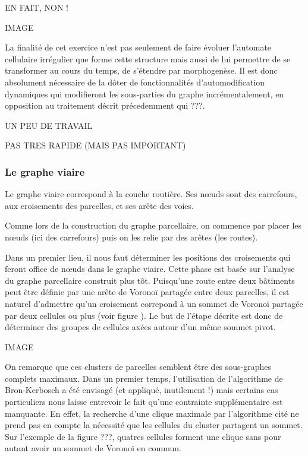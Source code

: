 \documentclass[10pt]{article}
\begin{document}
EN FAIT, NON !

IMAGE

La finalité de cet exercice n'est pas seulement de faire évoluer
l'automate cellulaire irrégulier que forme cette structure mais aussi
de lui permettre de se transformer au cours du temps, de s'étendre par
morphogenèse. Il est donc absolument nécessaire de la dôter de
fonctionnalités d'automodification dynamiques qui modifieront les
sous-parties du graphe incrémentalement, en opposition au traitement
décrit précedemment qui ???.

UN PEU DE TRAVAIL

PAS TRES RAPIDE (MAIS PAS IMPORTANT)

\subsubsection{Le graphe viaire}

Le graphe viaire correspond à la couche routière. Ses n\oe uds sont
des carrefours, aux croisements des parcelles, et ses arête des voies.

Comme lors de la construction du graphe parcellaire, on commence par
placer les n\oe uds (ici des carrefours) puis on les relie par des
arêtes (les routes).

Dans un premier lieu, il nous faut déterminer les positions des
croisements qui feront office de n\oe uds dans le graphe viaire. Cette
phase est basée sur l'analyse du graphe parcellaire construit plus
tôt. Puisqu'une route entre deux bâtiments peut être définie par une
arête de Voronoï partagée entre deux parcelles, il est naturel
d'admettre qu'un croisement correpond à un sommet de Voronoï partagée
par deux cellules ou plus (voir figure ). Le but de l'étape décrite
est donc de déterminer des groupes de cellules axées autour d'un même
sommet pivot.

IMAGE

On remarque que ces clusters de parcelles semblent être des
sous-graphes complets maximaux. Dans un premier temps, l'utilisation
de l'algorithme de Bron-Kerbosch a été envisagé (et appliqué,
inutilement !) mais certains cas particuliers nous laisse entrevoir
le fait qu'une contrainte supplémentaire est manquante. En effet, la
recherche d'une clique maximale par l'algorithme cité ne prend pas en
compte la nécessité que les cellules du cluster partagent un
sommet. Sur l'exemple de la figure ???, quatres cellules forment une
clique sans pour autant avoir un sommet de Voronoï en commun.
\end{document}
